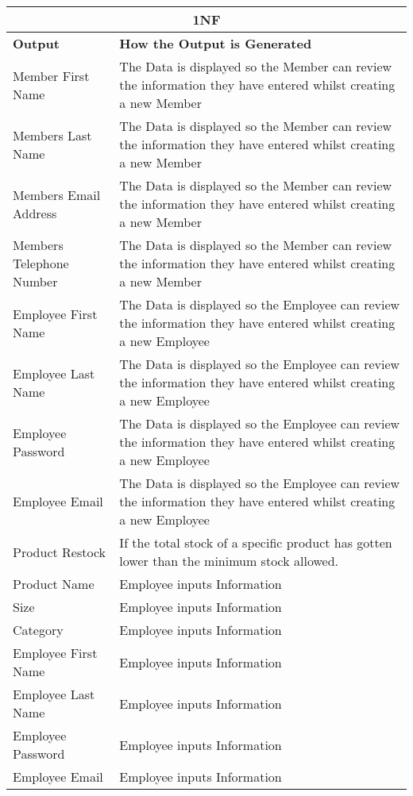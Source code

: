     \begin{tabular}{|p{4cm}|p{4cm}|}
        \hline
	 \multicolumn{2}{|c|}{1NF} \\ \hline
	\textbf{Output} & \textbf{ How the Output is Generated}\\ \hline
	{Member First Name} & {The Data is displayed so the Member can review the information they have entered whilst creating a new Member}\\ \hline
	{Members Last Name} & {The Data is displayed so the Member can review the information they have entered whilst creating a new Member}\\ \hline
	{Members Email Address} & {The Data is displayed so the Member can review the information they have entered whilst creating a new Member}\\ \hline
	{Members Telephone Number} & {The Data is displayed so the Member can review the information they have entered whilst creating a new Member}\\ \hline
	{Employee First Name} & {The Data is displayed so the Employee can review the information they have entered whilst creating a new Employee}\\ \hline
	{Employee Last Name} & {The Data is displayed so the Employee can review the information they have entered whilst creating a new Employee}\\ \hline
	{Employee Password} & {The Data is displayed so the Employee can review the information they have entered whilst creating a new Employee}\\ \hline
	{Employee Email} & {The Data is displayed so the Employee can review the information they have entered whilst creating a new Employee}\\ \hline
	{Product Restock} & {If the total stock of a specific product has gotten lower than the minimum stock allowed.}\\ \hline
	{Product Name} & {Employee inputs Information}\\ \hline
	{Size} & {Employee inputs Information}\\ \hline
	{Category} & {Employee inputs Information}\\ \hline
	{Employee First Name} & {Employee inputs Information}\\ \hline
	{Employee Last Name} & {Employee inputs Information}\\ \hline
	{Employee Password} & {Employee inputs Information}\\ \hline
	{Employee Email} & {Employee inputs Information}\\ \hline

\end{tabular}
